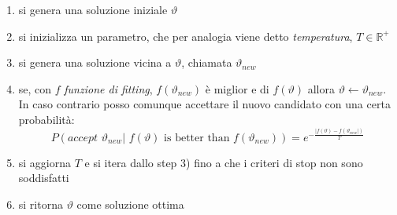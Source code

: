 \documentclass[a4paper,12pt, oneside]{book}
\begin{document}
\begin{enumerate}
  \item si genera una soluzione iniziale $\vartheta$
  \item si inizializza un parametro, che per analogia viene detto
  \textit{temperatura}, $T\in \mathbb{R}^{+}$
  \item si genera una soluzione vicina a $\vartheta$, chiamata $\vartheta_{new}$
  \item se, con $f$ \textit{funzione di fitting}, $f(\vartheta_{new})$ è miglior
  e di $f(\vartheta)$ allora $\vartheta \gets \vartheta_{new}$. In caso
  contrario posso comunque accettare il nuovo candidato con una certa
  probabilità:
  \[P(accept\,\, \vartheta_{new}|\,\,f(\vartheta)\mbox{ is better than
    }f(\vartheta_{new}))=e^{-\frac{|f(\vartheta)-f(\vartheta_{new}|)}{T}}\] 
  \item si aggiorna $T$ e si itera dallo step 3) fino a che i criteri di stop
  non sono soddisfatti
  \item si ritorna $\vartheta$ come soluzione ottima
\end{enumerate}
\end{document}
